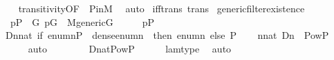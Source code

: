 \begin{isabellebody}
%
\isadelimproof
\ \ %
\endisadelimproof
%
\isatagproof
{}\isamarkupfalse%
\ transitivity{\isacharbrackleft}{\kern0pt}OF\ {\isacharunderscore}{\kern0pt}\ P{\isacharunderscore}{\kern0pt}in{\isacharunderscore}{\kern0pt}M{\isacharbrackright}{\kern0pt}\ \isamarkupfalse%
\ auto%
\endisatagproof
{\isafoldproof}%
%
\isadelimproof
\isanewline
%
\endisadelimproof
\isanewline
{}\isamarkupfalse%
\ iff{\isacharunderscore}{\kern0pt}trans\ {\isacharbrackleft}{\kern0pt}trans{\isacharbrackright}{\kern0pt}\isanewline
\isanewline
{}\isamarkupfalse%
\ generic{\isacharunderscore}{\kern0pt}filter{\isacharunderscore}{\kern0pt}existence{\isacharcolon}{\kern0pt}\ \isanewline
\ \ {\isachardoublequoteopen}p{\isasymin}P\ {\isasymLongrightarrow}\ {\isasymexists}G{\isachardot}{\kern0pt}\ p{\isasymin}G\ {\isasymand}\ M{\isacharunderscore}{\kern0pt}generic{\isacharparenleft}{\kern0pt}G{\isacharparenright}{\kern0pt}{\isachardoublequoteclose}\isanewline
%
\isadelimproof
%
\endisadelimproof
%
\isatagproof
{}\isamarkupfalse%
\ {\isacharminus}{\kern0pt}\isanewline
\ \ \isamarkupfalse%
\ {\isachardoublequoteopen}p{\isasymin}P{\isachardoublequoteclose}\isanewline
\ \ \isamarkupfalse%
\ {\isacharquery}{\kern0pt}D{\isacharequal}{\kern0pt}{\isachardoublequoteopen}{\isasymlambda}n{\isasymin}nat{\isachardot}{\kern0pt}\ {\isacharparenleft}{\kern0pt}if\ {\isacharparenleft}{\kern0pt}enum{\isacharbackquote}{\kern0pt}n{\isasymsubseteq}P\ {\isasymand}\ dense{\isacharparenleft}{\kern0pt}enum{\isacharbackquote}{\kern0pt}n{\isacharparenright}{\kern0pt}{\isacharparenright}{\kern0pt}\ \ then\ enum{\isacharbackquote}{\kern0pt}n\ else\ P{\isacharparenright}{\kern0pt}{\isachardoublequoteclose}\isanewline
\ \ \isamarkupfalse%
\ {\isachardoublequoteopen}{\isasymforall}n{\isasymin}nat{\isachardot}{\kern0pt}\ {\isacharquery}{\kern0pt}D{\isacharbackquote}{\kern0pt}n\ {\isasymin}\ Pow{\isacharparenleft}{\kern0pt}P{\isacharparenright}{\kern0pt}{\isachardoublequoteclose}\isanewline
\ \ \ \ \isamarkupfalse%
\ auto\isanewline
\ \ \isamarkupfalse%
\ \isanewline
\ \ \isamarkupfalse%
\ {\isachardoublequoteopen}{\isacharquery}{\kern0pt}D{\isacharcolon}{\kern0pt}nat{\isasymrightarrow}Pow{\isacharparenleft}{\kern0pt}P{\isacharparenright}{\kern0pt}{\isachardoublequoteclose}\isanewline
\ \ \ \ \isamarkupfalse%
\ lam{\isacharunderscore}{\kern0pt}type\ \isamarkupfalse%
\ auto\isanewline
\ \ \isamarkupfalse%

\end{isabellebody}
